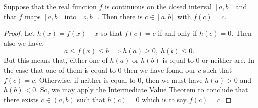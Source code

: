 \documentclass[MathsNotesBase.tex]{subfiles}
\begin{document}
{		\bigskip
		\begin{corollary}
			\label{coro:continuous_func_mapping_interval_to_itself_has_invariant_point}
			Suppose that the real function $f$ is continuous on the closed interval ${ [a,b] }$ and that $f$ maps ${ [a,b] }$ into ${ [a,b] }$. Then there is ${ c \in [a,b] }$ with ${ f(c) = c }$.
		\end{corollary}
		\begin{proof}
			Let ${ h(x) = f(x) - x }$ so that ${ f(c) = c }$ if and only if ${ h(c) = 0 }$. Then also we have,
			\[ a \leq f(x) \leq b \implies h(a) \geq 0,\; h(b) \leq 0. \]
			But this means that, either one of $h(a)$ or $h(b)$ is equal to 0 or neither are. In the case that one of them is equal to 0 then we have found our $c$ such that ${ f(c) = c }$. Otherwise, if neither is equal to 0, then we must have ${ h(a) > 0 }$ and ${ h(b) < 0 }$. So, we may apply the Intermediate Value Theorem to conclude that there exists ${ c \in (a,b) }$ such that ${ h(c) = 0 }$ which is to say ${ f(c) = c }$.
		\end{proof}

		\bigskip
}
\end{document}
